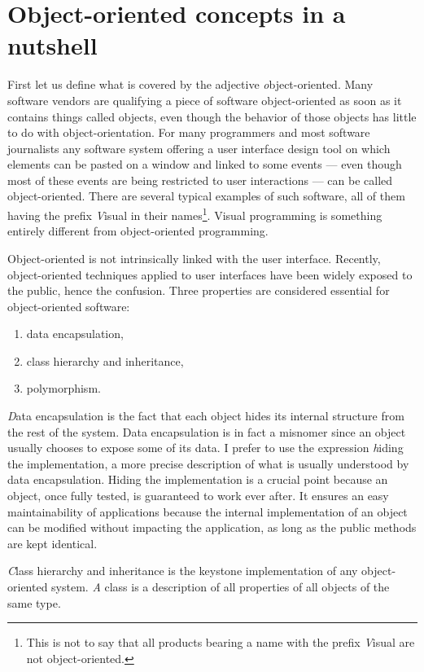\section{Object-oriented concepts in a nutshell}
First let us define what is covered by the adjective {\textit
object-oriented}. Many software vendors are qualifying a piece of
software object-oriented as soon as it contains things called
objects, even though the behavior of those objects has little to
do with object-orientation. For many programmers and most software
journalists any software system offering a user interface design
tool on which elements can be pasted on a window and linked to
some events --- even though most of these events are being
restricted to user interactions --- can be called object-oriented.
There are several typical examples of such software, all of them
having the prefix {\textit Visual} in their names\footnote{This is not
to say that all products bearing a name with the prefix {\textit
Visual} are not object-oriented.}. Visual programming is something
entirely different from object-oriented programming.
\par
Object-oriented is not intrinsically linked
with the user interface. Recently, object-oriented techniques
applied to user interfaces have been widely exposed to the public,
hence the confusion. Three properties are considered
essential for object-oriented software:
\begin{enumerate}
\item data encapsulation,
\item class hierarchy and inheritance,
\item polymorphism.
\end{enumerate}
{\textit Data encapsulation} is the fact that each object hides its
internal structure from the rest of the system. Data encapsulation
is in fact a misnomer since an object usually chooses to expose
some of its data. I prefer to use the expression {\textit hiding the
implementation}, a more precise description of what is usually
understood by data encapsulation. Hiding the implementation is a
crucial point because an object, once fully tested, is guaranteed
to work ever after. It ensures an easy maintainability of
applications because the internal implementation of an object can
be modified without impacting the application, as long as the
public methods are kept identical.
\par
{\textit Class hierarchy and inheritance} is the keystone
implementation of any object-oriented system. {\textit A class} is a
description of all properties of all objects of the same type.

